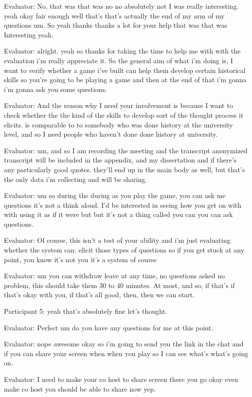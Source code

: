 \documentclass{l4proj}
\begin{document}
\begin{appendices}
Evaluator: No, that was that was no no absolutely not I was really interesting. yeah okay fair enough well that's that's actually the end of my arm of my questions um. So yeah thanks thanks a lot for your help that was that was Interesting yeah.


Evaluator: alright. yeah so thanks for taking the time to help me with with the evaluation i'm really appreciate it.  So the general aim of what i'm doing is, I want to verify whether a game i've built can help them develop certain historical skills so you're going to be playing a game and then at the end of that i'm gonna i'm gonna ask you some questions.

Evaluator: And the reason why I need your involvement is because I want to check whether the the kind of the skills to develop sort of the thought process it elicits. is comparable to to somebody who was done history at the university level, and so I need people who haven't done done history at university.

Evaluator: um, and so I am recording the meeting and the transcript anonymized transcript will be included in the appendix, and my dissertation and if there's any particularly good quotes. they'll end up in the main body as well, but that's the only data i'm collecting and will be sharing.

Evaluator: um so during the during as you play the game, you can ask me questions it's not a think aloud. I'd be interested in seeing how you get on with with using it as if it were but but it's not a thing called you can you can ask questions.

Evaluator: Of course, this isn't a test of your ability and i'm just evaluating whether the system can. elicit those types of questions so if you get stuck at any point, you know it's not you it's a system of course 

Evaluator: um you can withdraw leave at any time, no questions asked no problem, this should take them 30 to 40 minutes. At most, and so, if that's if that's okay with you, if that's all good, then, then we can start.

Participant 5: yeah that's absolutely fine let's thought.

Evaluator: Perfect um do you have any questions for me at this point.

Evaluator: nope awesome okay so i'm going to send you the link in the chat and if you can share your screen when when you play so I can see what's what's going on.

Evaluator: I need to make your co host to share screen there you go okay even make co host you should be able to share now yep.


\end{appendices}
\end{document}
